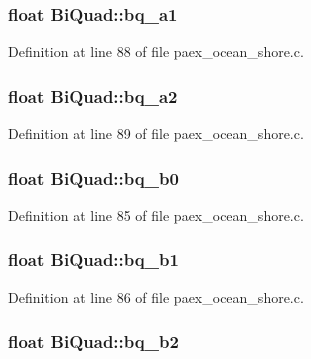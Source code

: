\subsubsection[{\texorpdfstring{bq\+\_\+a1}{bq_a1}}]{\setlength{\rightskip}{0pt plus 5cm}float Bi\+Quad\+::bq\+\_\+a1}\hypertarget{struct_bi_quad_afc64d4491bf95b1aafaf036a3a1ec544}{}\label{struct_bi_quad_afc64d4491bf95b1aafaf036a3a1ec544}


Definition at line 88 of file paex\+\_\+ocean\+\_\+shore.\+c.

\subsubsection[{\texorpdfstring{bq\+\_\+a2}{bq_a2}}]{\setlength{\rightskip}{0pt plus 5cm}float Bi\+Quad\+::bq\+\_\+a2}\hypertarget{struct_bi_quad_a44ed6f441b25d98880fce5ba33f56432}{}\label{struct_bi_quad_a44ed6f441b25d98880fce5ba33f56432}


Definition at line 89 of file paex\+\_\+ocean\+\_\+shore.\+c.

\subsubsection[{\texorpdfstring{bq\+\_\+b0}{bq_b0}}]{\setlength{\rightskip}{0pt plus 5cm}float Bi\+Quad\+::bq\+\_\+b0}\hypertarget{struct_bi_quad_a733b09def873b098d577620155c26a4d}{}\label{struct_bi_quad_a733b09def873b098d577620155c26a4d}


Definition at line 85 of file paex\+\_\+ocean\+\_\+shore.\+c.

\subsubsection[{\texorpdfstring{bq\+\_\+b1}{bq_b1}}]{\setlength{\rightskip}{0pt plus 5cm}float Bi\+Quad\+::bq\+\_\+b1}\hypertarget{struct_bi_quad_ab7889f23cfa53a67288bd7391e3631f4}{}\label{struct_bi_quad_ab7889f23cfa53a67288bd7391e3631f4}


Definition at line 86 of file paex\+\_\+ocean\+\_\+shore.\+c.

\subsubsection[{\texorpdfstring{bq\+\_\+b2}{bq_b2}}]{\setlength{\rightskip}{0pt plus 5cm}float Bi\+Quad\+::bq\+\_\+b2}\hypertarget{struct_bi_quad_a1a7098ce9c1167023fb886b2500a29fd}{}\label{struct_bi_quad_a1a7098ce9c1167023fb886b2500a29fd}


